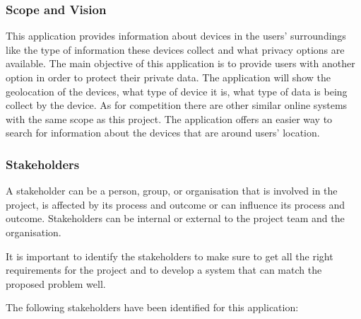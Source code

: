 \subsubsection{Scope and Vision}

This application provides information about \hyperlink{\acronym}{\acronym} devices in the users'
surroundings like the type of information
these devices collect and what privacy options are available. The main objective
of this application is to provide users with another option in order to protect
their private data. The application will show the geolocation of the \hyperlink{\acronym}{\acronym}
devices, what type of device it is, what type of data is being collect by
the device. As for competition there are other similar
online systems with the same scope as this project. The application offers
an easier way to search for information about the \hyperlink{\acronym}{\acronym} devices that are around users'
location.

\subsubsection{Stakeholders}

A stakeholder can be a person, group, or organisation that is involved in
the project, is affected by its process and outcome or can influence its
process and outcome. Stakeholders can be internal or external to the project
team and the organisation.

It is important to identify the stakeholders to make sure to get all the
right requirements for the project and to develop a system that can match
the proposed problem well.

The following stakeholders have been identified for this application:

